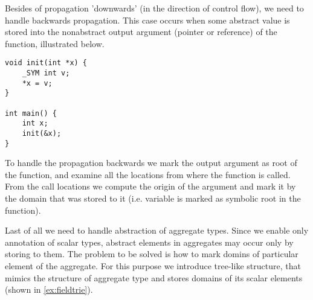 Besides of propagation 'downwards' (in the direction of control flow), we need
to handle backwards propagation. This case occurs when some abstract value is
stored into the nonabstract output argument (pointer or reference) of the function,
illustrated below.

\begin{verbatim}
void init(int *x) {
    _SYM int v;
    *x = v;
}

int main() {
    int x;
    init(&x);
}

\end{verbatim}

To handle the propagation backwards we mark the output argument as root of the
function, and examine all the locations from where the function is called. From
the call locations we compute the origin of the argument and mark it by the
domain that was stored to it (i.e. variable  is marked as symbolic root
in the  function).

Last of all we need to handle abstraction of aggregate types. Since we enable
only annotation of scalar types, abstract elements in aggregates may occur
only by storing to them. The problem to be solved is how to mark domins of
particular element of the aggregate. For this purpose we introduce tree-like
structure, that mimics the structure of aggregate type and stores domains of
its scalar elements (shown in \autoref{ex:fieldtrie}).

